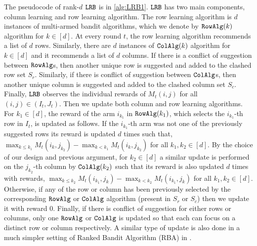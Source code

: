 The pseudocode of rank-$d$ ${\tt LRB}$ is in \cref{alg:LRB1}. ${\tt LRB}$ has two main components, column learning and row learning algorithm. The row learning algorithm is $d$ instances of multi-armed bandit algorithms, which we denote by ${\tt RowAlg}(k)$ algorithm for $k \in [d]$. At every round $t$, the row learning algorithm recommends a list of $d$ rows. Similarly, there are $d$ instances of ${\tt ColAlg}(k)$ algorithm for $k \in [d]$ and it recommends a list of $d$ columns. If there is a conflict of suggestion between ${\tt RowAlg}$s, then another unique row is suggested and added to the clashed row set $S_r$. Similarly, if there is conflict of suggestion between ${\tt ColAlg}$s, then another unique column is suggested and added to the clashed column set  $S_c$. Finally, ${\tt LRB}$ observes the individual rewards of $M_t(i,j)$ for all $(i,j)\in (I_t, J_t)$. Then we update both column and row learning algorithms. For $k_1 \in [d]$, the reward of the arm $i_{k_1}$ in ${\tt RowAlg}(k_1)$, which selects the $i_{k_1}$-th row in $I_t$, is updated as follows. If the $i_{k_1}$-th arm was not one of the previously suggested rows its reward is updated $d$ times such that, $\max_{k \leq k_1} M_t(i_k, j_{k_2}) - \max_{k < k_1} M_t(i_k, j_{k_2})$ for all $k_1,k_2 \in [d]$. By the choice of our design and previous argument, for $k_2 \in [d]$ a similar update is performed on the $j_{k_2}$-th column by ${\tt ColAlg}(k_2)$ such that its reward is also updated $d$ times with rewards, $\max_{k \leq k_2} M_t(i_{k_1}, j_k)  - \max_{k < k_2} M_t(i_{k_1}, j_k)$ for all $k_1,k_2 \in [d]$. Otherwise, if any of the row or column has been previously selected by the corresponding ${\tt RowAlg}$ or ${\tt ColAlg}$ algorithm (present in $S_r$ or $S_c$) then we update it with reward $0$. Finally, if there is conflict of suggestion for either rows or columns, only one ${\tt RowAlg}$ or ${\tt ColAlg}$ is updated so that each can focus on a distinct row or column respectively. A similar type of update is also done in a much simpler setting of Ranked Bandit Algorithm (RBA) in \citet{radlinski2008learning}.







